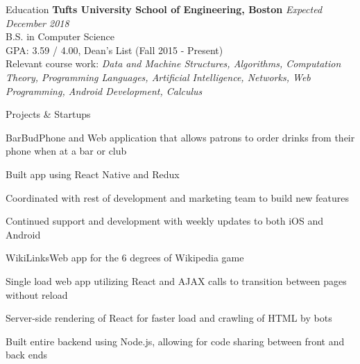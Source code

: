 \documentclass{resume}
\begin{document}
  \begin{rSection}{Education}
    {\bf Tufts University School of Engineering, Boston} \hfill {\em Expected December 2018} \\ 
    { B.S. in Computer Science} \\
    GPA: 3.59 / 4.00, Dean's List (Fall 2015 - Present)\\
    Relevant course work: \textit{Data and Machine Structures, Algorithms, Computation Theory, Programming Languages, Artificial Intelligence, Networks, Web Programming, Android Development, Calculus}
  \end{rSection}
  
  \begin{rSection}{Projects \& Startups}
  
    \begin{rSubsection}{BarBud}{}{\normalfont Phone and Web application that allows patrons to order drinks from their phone when at a bar or club}{}
    \item Built app using React Native and Redux
    \item Coordinated with rest of development and marketing team to build new features
    \item Continued support and development with weekly updates to both iOS and Android
  \end{rSubsection}
  
  \begin{rSubsection}{WikiLinks}{}{\normalfont Web app for the 6 degrees of Wikipedia game}{}
  \item Single load web app utilizing React and AJAX calls to transition between pages without reload
  \item Server-side rendering of React for faster load and crawling of HTML by bots
  \item Built entire backend using Node.js, allowing for code sharing between front and back ends
  \end{rSubsection}
   
  \end{rSection}
  
\end{document}

